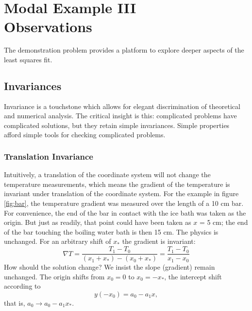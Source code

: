 \chapter[Modal Example III: Observations]{Modal Example III\\Observations}

The demonstration problem provides a platform to explore deeper aspects of the least squares fit.

\section{Invariances}  %
Invariance is a touchstone which allows for elegant discrimination of theoretical and numerical analysis. The critical insight is this: complicated problems have complicated solutions, but they retain simple invariances. Simple properties afford simple tools for checking complicated problems.

\subsection{Translation Invariance}  %
Intuitively, a translation of the coordinate system will not change the temperature measurements, which means the gradient of the temperature is invariant under translation of the coordinate system.
For the example in figure \ref{fig:bar}, the temperature gradient was measured over the length of a 10 cm bar. For convenience, the end of the bar in contact with the ice bath was taken as the origin. But just as readily, that point could have been taken as $x$ = 5 cm; the end of the bar touching the boiling water bath is then 15 cm. The physics is unchanged. For an arbitrary shift of $x_{*}$ the gradient is invariant:
  \begin{equation*}   %
    \nabla T = \frac{T_{1} - T_{0}} { (x_{1} + x_{*}) - (x_{0} + x_{*}) }
             = \frac{T_{1} - T_{0}} { x_{1} - x_{0} }
  \end{equation*}
How should the solution change? We insist the slope (gradient) remain unchanged. The origin shifts from $x_{0}=0$ to $x_{0}=-x_{*}$, the intercept shift according to
  \begin{equation*}   %
      y(-x_{0}) = a_{0} - a_{1} x,
  \end{equation*}
that is, $a_{0} \to a_{0} - a_{1} x_{*}$.

